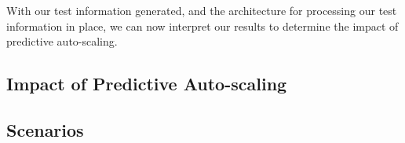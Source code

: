 With our test information generated, and the architecture for processing our
test information in place, we can now interpret our results to determine the
impact of predictive auto-scaling.

\subsection{Impact of Predictive Auto-scaling}



\subsection{Scenarios}


